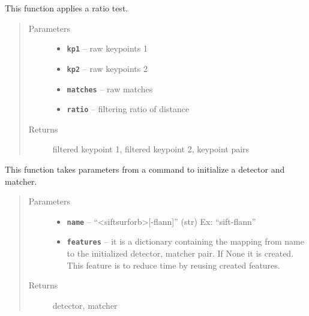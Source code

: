 \documentclass[letterpaper,10pt,english]{sphinxmanual}
\begin{document}

\begin{fulllineitems}
\label{RRtoolbox.lib:RRtoolbox.lib.descriptors.filter_matches}
This function applies a ratio test.
\begin{quote}\begin{description}
\item[{Parameters}] \leavevmode\begin{itemize}
\item {} 
\textbf{\texttt{kp1}} -- raw keypoints 1

\item {} 
\textbf{\texttt{kp2}} -- raw keypoints 2

\item {} 
\textbf{\texttt{matches}} -- raw matches

\item {} 
\textbf{\texttt{ratio}} -- filtering ratio of distance

\end{itemize}

\item[{Returns}] \leavevmode
filtered keypoint 1, filtered keypoint 2, keypoint pairs

\end{description}\end{quote}

\end{fulllineitems}


\begin{fulllineitems}
\label{RRtoolbox.lib:RRtoolbox.lib.descriptors.init_feature}
This function takes parameters from a command to initialize a detector and matcher.
\begin{quote}\begin{description}
\item[{Parameters}] \leavevmode\begin{itemize}
\item {} 
\textbf{\texttt{name}} -- ``\textless{}sift\textbar{}surf\textbar{}orb\textgreater{}{[}-flann{]}'' (str) Ex: ``sift-flann''

\item {} 
\textbf{\texttt{features}} -- it is a dictionary containing the mapping from name to the
initialized detector, matcher pair. If None it is created.
This feature is to reduce time by reusing created features.

\end{itemize}

\item[{Returns}] \leavevmode
detector, matcher

\end{description}\end{quote}

\end{fulllineitems}
\end{document}
